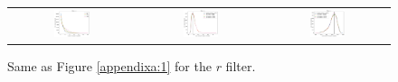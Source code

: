 \documentclass[preprintm,linenumbers]{aastex631}
\begin{document}
  
  \begin{figure}[h]
			\centering
			\begin{tabular}{c c c}
				
				\includegraphics[width=0.3\textwidth]{results/histograms_templates_tscale/hist_first_year_one_snap_v4_0_10yrs_db_noDD_noTwi_doALLTemplateMetrics_reduceNTemplate_r_noDD_noTwi.pdf} &
				\includegraphics[width=0.3\textwidth]{results/histograms_templates_tscale/hist_first_year_one_snap_v4_0_10yrs_db_noDD_noTwi_doALLTemplateMetrics_reduceSeeingTemplate_r_noDD_noTwi.pdf} &
				\includegraphics[width=0.3\textwidth]{results/histograms_templates_tscale/hist_first_year_one_snap_v4_0_10yrs_db_noDD_noTwi_doALLTemplateMetrics_reduceDepthTemplate_r_noDD_noTwi.pdf} \\
				
			\end{tabular}
			\caption{
				Same as Figure \ref{appendixa:1} for the $r$ filter.  \label{appendixa:3}
			}
		\end{figure}
\end{document}
